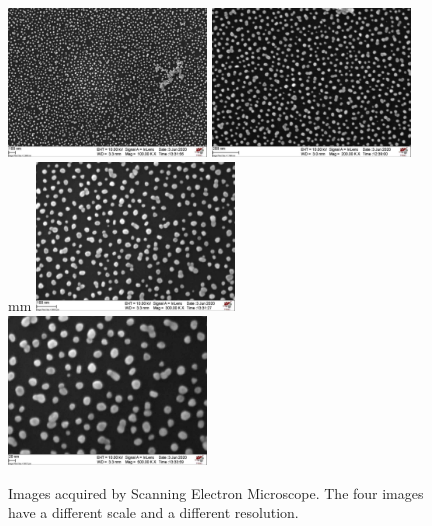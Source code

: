\documentclass[prb,twocolumn]{revtex4-1}
\begin{document}
\begin{figure}[htp]
    \centering 
    \includegraphics[width=0.47\textwidth]{images/sem/AuNP_05.pdf}
    \hskip 0.01mm
    \includegraphics[width=0.47\textwidth]{images/sem/AuNP_01.pdf}
    \hskip 0.01mm \\
     mm
    \includegraphics[width=0.47\textwidth]{images/sem/AuNP_04.pdf}
    \hskip 0.01mm
    \includegraphics[width=0.47\textwidth]{images/sem/AuNP_07.pdf}
    \caption{Images acquired by Scanning Electron Microscope. The four images have a different scale and a different resolution. }
    \label{fig:sem_image}
\end{figure}
\end{document}
